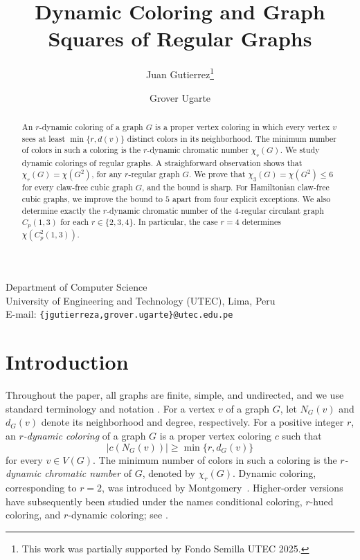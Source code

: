 \documentclass[a4paper,11pt]{article}
\theoremstyle{case}
\numberwithin{subcase}{case}
\begin{document}
\title{Dynamic Coloring and Graph Squares of Regular Graphs}


\author{
Juan Gutierrez\thanks{This work was partially supported by Fondo Semilla UTEC 2025.}
\and
Grover Ugarte\footnotemark[1]
}
\date{}
\maketitle

\begin{center}
\footnotesize
Department of Computer Science\\
University of Engineering and Technology (UTEC), Lima, Peru\\
E-mail: \texttt{\{jgutierreza,grover.ugarte\}@utec.edu.pe}
\end{center}

\begin{abstract}
An $r$-dynamic coloring of a graph $G$ is a proper vertex coloring in
which every vertex $v$ sees at least $\min\{r,d(v)\}$ distinct colors
in its neighborhood. 
The minimum number of colors in such a
coloring is the $r$-dynamic chromatic number $\chi_r(G)$.
We study dynamic colorings of regular graphs. A straighforward observation shows that  $\chi_r(G)=\chi(G^2)$, for any $r$-regular graph $G$.
We prove that
$
\chi_3(G)=\chi(G^2)\le6
$
for every claw-free cubic graph $G$, and the bound is sharp.
For Hamiltonian claw-free cubic graphs, we improve the bound to $5$
apart from four explicit exceptions.
We also determine exactly the $r$-dynamic chromatic number of the
$4$-regular circulant graph $C_p(1,3)$ for each
$r\in\{2,3,4\}$. In particular, the case $r=4$ determines
$\chi(C^2_p(1,3))$.
\end{abstract}
\section{Introduction}

Throughout the paper, all graphs are finite, simple, and undirected,
and we use standard terminology and notation
\cite{bondy_graph_2008,diestel_graph_2017}.
For a vertex $v$ of a graph $G$, let $N_G(v)$ and $d_G(v)$ denote its
neighborhood and degree, respectively.
For a positive integer $r$, an \emph{$r$-dynamic coloring} of a graph
$G$ is a proper vertex coloring $c$ such that
\[
|c(N_G(v))|\ge \min\{r,d_G(v)\}
\]
for every $v\in V(G)$. The minimum number of colors in such a coloring
is the \emph{$r$-dynamic chromatic number} of $G$, denoted by
$\chi_r(G)$. Dynamic coloring, corresponding to $r=2$, was introduced
by Montgomery~\cite{montgomery2001dynamic}. Higher-order versions have
subsequently been studied under the names conditional coloring,
$r$-hued coloring, and $r$-dynamic coloring; see
\cite{CHEN202224,LAI20061997}.
\end{document}
